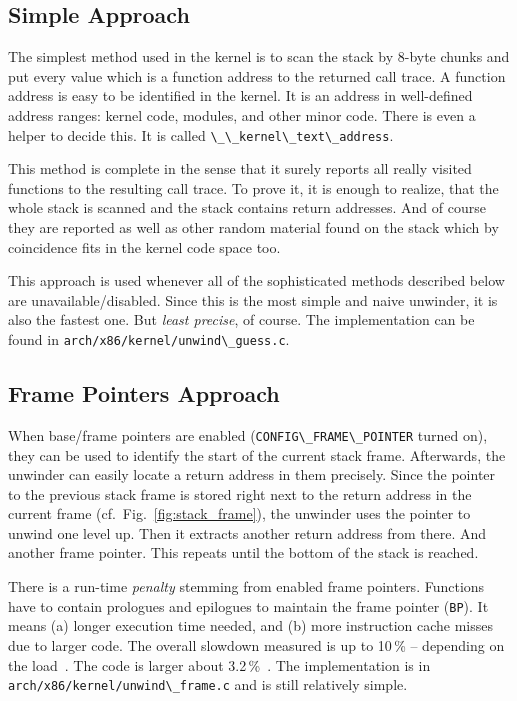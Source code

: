 \documentclass[10pt]{llncs}
\newcommand{\code}[2][]{\lstinline[columns=fullflexible, #1]$#2$}
\newcommand{\file}[2][]{\code[language={}, #1]{#2}}
\begin{document}
\subsection{Simple Approach} \label{sec:unw_guess}
The simplest method used in the kernel is to scan the stack by 8-byte chunks
and put every value which is a function address to the returned call trace. A
function address is easy to be identified in the kernel. It is an address in
well-defined address ranges: kernel code, modules, and other minor code. There
is even a helper to decide this. It is called
\code{\_\_kernel\_text\_address}.

This method is complete in the sense that it surely reports all really visited
functions to the resulting call trace. To prove it, it is enough to realize,
that the whole stack is scanned and the stack contains return addresses.  And
of course they are reported as well as other random material found on the
stack which by coincidence fits in the kernel code space too.

This approach is used whenever all of the sophisticated methods described
below are unavailable/disabled. Since this is the most simple and naive
unwinder, it is also the fastest one.  But \emph{least precise}, of course.
The implementation can be found in \file{arch/x86/kernel/unwind\_guess.c}.

\subsection{Frame Pointers Approach} \label{sec:unw_fp}
When base/frame pointers are enabled (\code{CONFIG\_FRAME\_POINTER} turned
on), they can be used to identify the start of the current stack frame.
Afterwards, the unwinder can easily locate a return address in them precisely.
Since the pointer to the previous stack frame is stored right next to the
return address in the current frame (cf.\ Fig.~\ref{fig:stack_frame}), the
unwinder uses the pointer to unwind one level up. Then it extracts another
return address from there. And another frame pointer. This repeats until the
bottom of the stack is reached.

There is a run-time \emph{penalty} stemming from enabled frame pointers.
Functions have to contain prologues and epilogues to maintain the frame
pointer (\code{BP}). It means (a) longer execution time needed, and (b) more
instruction cache misses due to larger code.  The overall slowdown measured is
up to 10\,\% -- depending on the load~\cite{fp_slowdown}.  The code is larger
about 3.2\,\%~\cite{orc_doc}.  The implementation is in
\file{arch/x86/kernel/unwind\_frame.c} and is still relatively simple.
\end{document}
